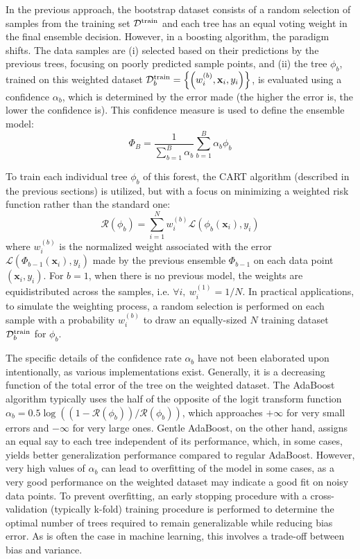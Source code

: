 \documentclass[main]{subfiles}
\begin{document}
In the previous approach, the bootstrap dataset consists of a random selection of samples from the training set $\mathcal{D}^{\text{train}}$ and each tree has an equal voting weight in the final ensemble decision. However, in a boosting algorithm,\autocite{drucker1997improving} the paradigm shifts. The data samples are (i) selected based on their predictions by the previous trees, focusing on poorly predicted sample points, and (ii) the tree $\phi_b$, trained on this weighted dataset $\mathcal{D}^{\text{train}}_b=\left\{\left(w_i^{(b)},\mathbf{x}_i,y_i\right)\right\}$, is evaluated using a confidence $\alpha_b$, which is determined by the error made (the higher the error is, the lower the confidence is). This confidence measure is used to define the ensemble model:
\begin{equation}
  \Phi_B = \frac{1}{\sum_{b=1}^{B} \alpha_b}\sum_{b=1}^{B} \alpha_b\phi_b
\end{equation}

To train each individual tree $\phi_b$ of this forest, the CART algorithm (described in the previous sections) is utilized, but with a focus on minimizing a weighted risk function rather than the standard one:
\begin{equation}
  \mathcal{R}(\phi_b) = \sum_{i=1}^N w_i^{(b)} \mathcal{L}\left(\phi_b(\mathbf{x}_i),y_i\right)
\end{equation}
where $w_i^{(b)}$ is the normalized weight associated with the error $\mathcal{L}\left(\Phi_{b-1}(\mathbf{x}_i),y_i\right)$ made by the previous ensemble $\Phi_{b-1}$ on each data point $\left(\mathbf{x}_i,y_i\right)$. For $b=1$, when there is no previous model, the weights are equidistributed across the samples, i.e. $\forall i,\ w_i^{(1)}=1/N$. In practical applications, to simulate the weighting process, a random selection is performed on each sample with a probability $w_i^{(b)}$ to draw an equally-sized $N$ training dataset $\mathcal{D}^{\text{train}}_b$ for $\phi_b$. 

The specific details of the confidence rate $\alpha_b$ have not been elaborated upon intentionally, as various implementations exist. Generally, it is a decreasing function of the total error of the tree on the weighted dataset. The AdaBoost algorithm typically uses the half of the opposite of the logit transform function $\alpha_b=0.5\log\left((1-\mathcal{R}(\phi_b))/\mathcal{R}(\phi_b)\right)$, which approaches $+\infty$ for very small errors and $-\infty$ for very large ones.\autocite{Freund_1997,schapire2013explaining} Gentle AdaBoost, on the other hand, assigns an equal say to each tree independent of its performance, which, in some cases, yields better generalization performance compared to regular AdaBoost. However, very high values of $\alpha_b$ can lead to overfitting of the model in some cases, as a very good performance on the weighted dataset may indicate a good fit on noisy data points.\autocite{schapire1998improved} To prevent overfitting, an early stopping procedure with a cross-validation (typically k-fold) training procedure is performed to determine the optimal number of trees required to remain generalizable while reducing bias error. As is often the case in machine learning, this involves a trade-off between bias and variance.
\end{document}
